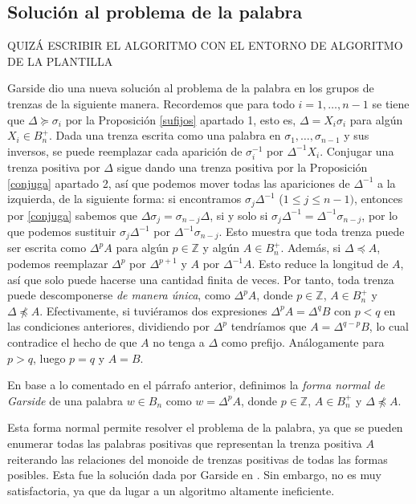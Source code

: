 \documentclass[bibtex, anon]{TEMat-article}
\newcommand{\Z}{\mathbb{Z}}
\begin{document}
\subsection{Solución al problema de la palabra}
QUIZÁ ESCRIBIR EL ALGORITMO CON EL ENTORNO DE ALGORITMO DE LA PLANTILLA 

Garside dio una nueva solución al problema de la palabra en los grupos de trenzas de la siguiente manera. Recordemos que para todo $i=1,\dots, n-1$ se tiene que $\Delta\succcurlyeq\sigma_i$ por la Proposición \ref{sufijos} apartado 1, esto es, $\Delta=X_i\sigma_i$ para algún $X_i\in B_n^+$. Dada una trenza escrita como una palabra en $\sigma_1,\dots,\sigma_{n-1}$ y sus inversos, se puede reemplazar cada aparición de $\sigma_i^{-1}$ por $\Delta^{-1}X_i$. Conjugar una trenza positiva por $\Delta$ sigue dando una trenza positiva por la Proposición \ref{conjuga} apartado 2, así que podemos mover todas las apariciones de $\Delta^{-1}$ a la izquierda, de la siguiente forma: si encontramos $\sigma_j\Delta^{-1}$ ($1\leq j\leq n-1)$, entonces por \ref{conjuga} sabemos que $\Delta\sigma_{j}=\sigma_{n-j}\Delta$, si y solo si  $\sigma_j\Delta^{-1}=\Delta^{-1}\sigma_{n-j}$, por lo que podemos sustituir $\sigma_j\Delta^{-1}$ por $\Delta^{-1}\sigma_{n-j}$. Esto muestra que toda trenza puede ser escrita como $\Delta^p A$ para algún $p\in\Z$ y algún $A\in B_n^+$. Además, si $\Delta\preccurlyeq A$, podemos reemplazar $\Delta^p$ por $\Delta^{p+1}$ y $A$ por $\Delta^{-1}A$. Esto reduce la longitud de $A$, así que solo puede hacerse una cantidad finita de veces. Por tanto, toda trenza puede descomponerse \emph{de manera única}, como $\Delta^pA$, donde $p\in\Z$, $A\in B_n^+$ y $\Delta\not\preccurlyeq A$. Efectivamente, si tuviéramos dos expresiones $\Delta^pA=\Delta^q B$ con $p<q$ en las condiciones anteriores, dividiendo por $\Delta^p$ tendríamos que $A=\Delta^{q-p}B$, lo cual contradice el hecho de que $A$ no tenga a $\Delta$ como prefijo. Análogamente para $p>q$, luego $p=q$ y $A=B$.

\begin{definicion}
	En base a lo comentado en el párrafo anterior, definimos la \emph{forma normal de Garside} de una palabra $w\in B_n$ como $w=\Delta^pA$, donde $p\in\Z$, $A\in B_n^+$ y $\Delta\not\preccurlyeq A$. 
\end{definicion}

Esta forma normal permite resolver el problema de la palabra, ya que se pueden enumerar todas las palabras positivas que representan la trenza positiva $A$ reiterando las relaciones del monoide de trenzas positivas de todas las formas posibles. Esta fue la solución dada por Garside en \cite{Garside}. Sin embargo, no es muy satisfactoria, ya que da lugar a un algoritmo altamente ineficiente.
\end{document}

